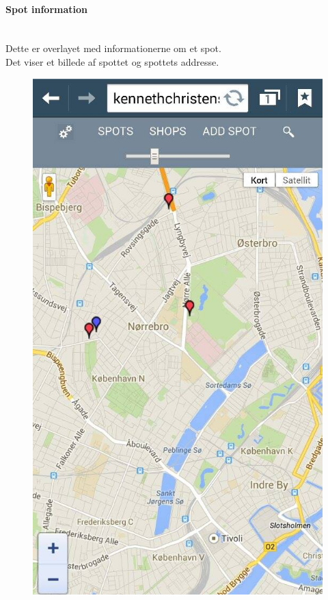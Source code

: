 \documentclass[12pt]{article}
\begin{document}
\paragraph{Spot information}\mbox{}\\
Dette er overlayet med informationerne om et spot.\\ Det viser et billede af spottet og spottets addresse.

\newpage
\begin{figure}[ht]
\begin{minipage}[b]{0.45\linewidth}
\centering
\includegraphics[width=\textwidth]{msettings}

\end{minipage}
\end{figure}
\end{document}
